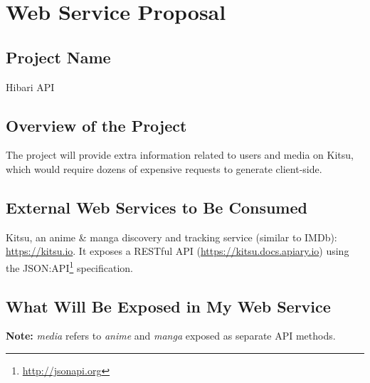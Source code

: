 \section{Web Service Proposal}
\subsection{Project Name}

Hibari API

\subsection{Overview of the Project}

The project will provide extra information  related to users and media on Kitsu, which would require dozens of expensive requests to generate client-side.

\subsection{External Web Services to Be Consumed}

Kitsu, an anime \& manga discovery and tracking service (similar to IMDb): \url{https://kitsu.io}. It exposes a RESTful API (\url{https://kitsu.docs.apiary.io}) using the JSON:API\footnote{\url{http://jsonapi.org}} specification.

\subsection{What Will Be Exposed in My Web Service}

\textbf{Note:} \textit{media} refers to \textit{anime} and \textit{manga} exposed as separate API methods.

